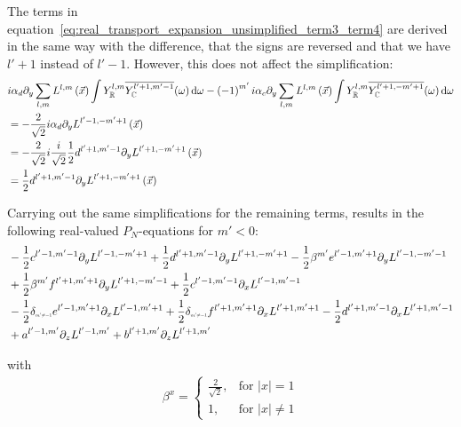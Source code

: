 \documentclass[10pt]{scrartcl}
\begin{document}
The terms in equation~\ref{eq:real_transport_expansion_unsimplified_term3_term4} are derived in the same way with the difference, that the signs are reversed and that we have $l'+1$ instead of $l'-1$. However, this does not affect the simplification:
\begin{align*}
&i\alpha_d\partial_y\sum_{l,m}L^{l,m}\left (\vec{x}\right)\int{Y_{\mathbb{R}}^{l,m}\overline{Y_{\mathbb{C}}^{l'+1, m'-1}}(\omega )\,\mathrm{d}\omega}
-\left({-1}\right)^{m'}i\alpha_c\partial_y\sum_{l,m}L^{l,m}\left (\vec{x}\right)\int{Y_{\mathbb{R}}^{l,m}\overline{Y_{\mathbb{C}}^{l'+1, -m'+1}}(\omega )\,\mathrm{d}\omega}
\\
&=-\frac{2}{\sqrt{2}}i
\alpha_d\partial_y
L^{l'-1,-m'+1}\left (\vec{x}\right)
\\
&=-\frac{2}{\sqrt{2}}i
\frac{i}{\sqrt{2}}\frac{1}{2}d^{{l'+1,m'-1}}
\partial_y
L^{l'+1,-m'+1}\left (\vec{x}\right)
\\
&=
\frac{1}{2}d^{{l'+1,m'-1}}
\partial_y
L^{l'+1,-m'+1}\left (\vec{x}\right)
\end{align*}

Carrying out the same simplifications for the remaining terms, results in the following real-valued $P_N$-equations for $m'<0$:
\begin{align*}
&-\frac{1}{2}c^{{l'-1,m'-1}}
\partial_y
L^{l'-1,-m'+1}
+\frac{1}{2}d^{{l'+1,m'-1}}
\partial_y
L^{l'+1,-m'+1}
-\frac{1}{2}\beta^{m'}e^{{l'-1,m'+1}}
\partial_y
L^{l'-1,-m'-1}
\\&
+\frac{1}{2}\beta^{m'}f^{{l'+1,m'+1}}
\partial_y
L^{l'+1,-m'-1}
+\frac{1}{2}c^{{l'-1,m'-1}}
\partial_x
L^{l'-1,m'-1}
\\&
-\frac{1}{2}\delta_{\scaleto{m'\neq -1}{4pt}}e^{{l'-1,m'+1}}
\partial_x
L^{l'-1,m'+1}
+\frac{1}{2}\delta_{\scaleto{m'\neq -1}{4pt}}f^{{l'+1,m'+1}}
\partial_x
L^{l'+1,m'+1}
-\frac{1}{2}d^{{l'+1,m'-1}}
\partial_x
L^{l'+1,m'-1}
\\&
+a^{{l'-1,m'}}
\partial_z
L^{l'-1,m'}
+b^{{l'+1,m'}}
\partial_z
L^{l'+1,m'}
\end{align*}

with
\begin{align}
\label{eq:real_sh_basis}
\beta^{x}=
\left\{
\begin{array}{lr}
\frac{2}{\sqrt{2}}, & \text{for } \vert x\vert = 1\\
1, & \text{for } \vert x\vert \neq 1
\end{array}
\right.
\end{align}
\end{document}

